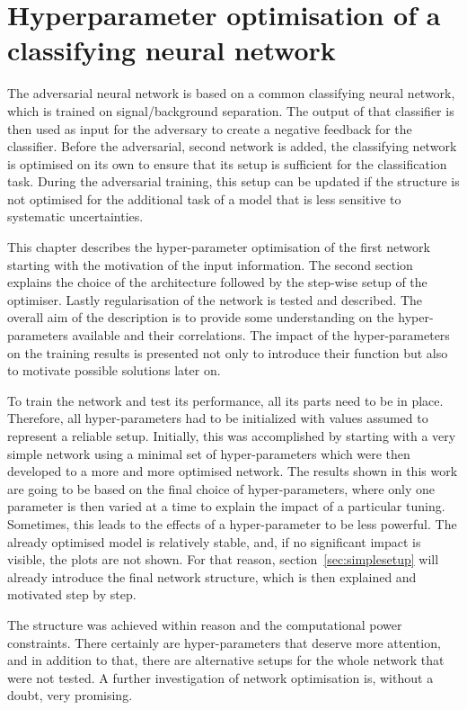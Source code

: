 \chapter{Hyperparameter optimisation of a classifying neural network}
\label{chp:simpleNN}

The adversarial neural network is based on a common classifying neural network, which is trained on signal/background separation. The output of that classifier is then used as input for the adversary to create a negative feedback for the classifier.
Before the adversarial, second network is added, the classifying network is optimised on its own to ensure that its setup is sufficient for the classification task.
During the adversarial training, this setup can be updated if the structure is not optimised for the additional task of a model that is less sensitive to systematic uncertainties.

This chapter describes the hyper-parameter optimisation of the first network starting with the motivation of the input information.
The second section explains the choice of the architecture followed by the step-wise setup of the optimiser.
Lastly regularisation of the network is tested and described.
The overall aim of the description is to provide some understanding on the hyper-parameters available and their correlations. The impact of the hyper-parameters on the training results is presented not only to introduce their function but also to motivate possible solutions later on.

To train the network and test its performance, all its parts need to be in place. Therefore, all hyper-parameters had to be initialized with values assumed to represent a reliable setup. Initially, this was accomplished by starting with a very simple network using a minimal set of hyper-parameters which were then developed to a more and more optimised network. The results shown in this work are going to be based on the final choice of hyper-parameters, where only one parameter is then varied at a time to explain the impact of a particular tuning. Sometimes, this leads to the effects of a hyper-parameter to be less powerful. The already optimised model is relatively stable, and, if no significant impact is visible, the plots are not shown. For that reason, section~\ref{sec:simplesetup} will already introduce the final network structure, which is then explained and motivated step by step.

The structure was achieved within reason and the computational power constraints. There certainly are hyper-parameters that deserve more attention, and in addition to that, there are alternative setups for the whole network that were not tested. A further investigation of network optimisation is, without a doubt, very promising.


